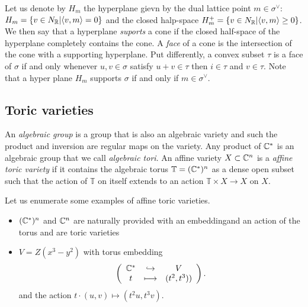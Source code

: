         Let us denote by $H_m$ the hyperplane gievn by the dual lattice point $m\in\sigma^\vee$: $H_m=\{v\in N_{\mathbb{R}}|\langle v,m\rangle=0\}$ and the closed halp-space $H^+_m=\{v\in N_{\mathbb{R}}|\langle v,m\rangle\geq0\}$. We then say that a hyperplane \emph{suports} a cone if the closed half-space of the hyperplane completely contains the cone. A \emph{face} of a cone is the intersection of the cone with a supporting hyperplane. Put differently, a convex subset $\tau$ is a face of $\sigma$ if and only whenever $u,v\in\sigma$ satisfy $u+v\in\tau$ then $i\in\tau$ and $v\in\tau$. Note that a hyper plane $H_m$ supports $\sigma$ if and only if $m\in\sigma^\vee$.

    \subsection{Toric varieties}

        An \emph{algebraic group} is a group that is also an algebraic variety and such the product and inversion are regular maps on the variety. Any product of $\mathbb{C}^*$ is an algebraic group that we call \emph{algebraic tori}. An affine variety $X\subset\mathbb{C}^n$ is a \emph{affine toric variety} if it contains the algebraic torus $\mathbb{T}=(\mathbb{C}^*)^n$ as a dense open subset such that the action of $\mathbb{T}$ on itself extends to an action $\mathbb{T}\times X\to X$ on $X$.

        \begin{examp*}
            Let us enumerate some examples of affine toric varieties.
            \begin{itemize}
                \item $(\mathbb{C}^*)^n$ and $\mathbb{C}^n$ are naturally provided with an embeddingand an action of the torus and are toric varieties
                \item $V=Z(x^3-y^2)$ with torus embedding
                \begin{equation}
                    \left(
                    \begin{array}{ccc}
                        \mathbb{C}^* & \hookrightarrow & V \\
                        t & \longmapsto & (t^2,t^3))
                    \end{array}
                    \right).
                \end{equation}
                and the action $t\cdot(u,v)\mapsto(t^2u,t^3v)$.
            \end{itemize}
        \end{examp*}

